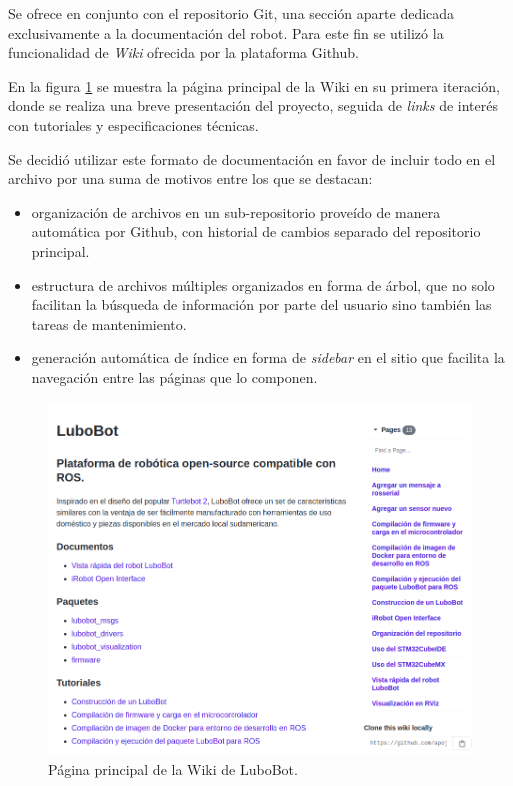 Se ofrece en conjunto con el repositorio Git\protect\footnotemark, una sección aparte dedicada exclusivamente a la documentación del robot. Para este fin se utilizó la funcionalidad de \textit{Wiki} ofrecida por la plataforma Github.



En la figura \ref{fig:wiki} se muestra la página principal de la Wiki en su primera iteración, donde se realiza una breve presentación del proyecto, seguida de \textit{links} de interés con tutoriales y especificaciones técnicas.

Se decidió utilizar este formato de documentación en favor de incluir todo en el archivo  por una suma de motivos entre los que se destacan:

\begin{itemize}
  \item organización de archivos en un sub-repositorio proveído de manera automática por Github, con historial de cambios separado del repositorio principal.
  \item estructura de archivos múltiples organizados en forma de árbol, que no solo facilitan la búsqueda de información por parte del usuario sino también las tareas de mantenimiento.
  \item generación automática de índice en forma de \textit{sidebar} en el sitio que facilita la navegación entre las páginas que lo componen.
\end{itemize}

\newpage

\begin{figure}[ht]
  \centering
  \includegraphics[scale=0.5]{./Figures/wiki.png}
  \caption{Página principal de la Wiki de LuboBot\protect\footnotemark.}
  \label{fig:wiki}
\end{figure}

